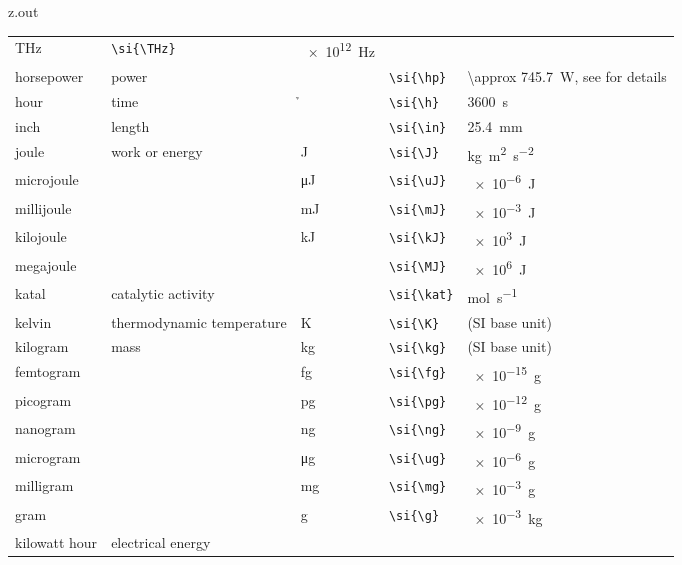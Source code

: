 \begin{VerbatimOut}{z.out}
{\begin{longtable}{@{}P{1.4in}P{1in}llP{1.8in}@{}}
      \si{\THz}&
      \verb+\si{\THz}+&
      \SI{e12}{\Hz}\\
    \vsp
    horsepower&
      power&
      \si{\hp}&
      \verb+\si{\hp}+&
      \SI{\approx 745.7}{\W},
        see \cite{wikipedia-horsepower} for details\\  %
    \vsp
    hour&
      time&
      \si{\h}&
      \verb+\si{\h}+&
      \SI{3600}{\s}\\
    \vsp
    inch&
      length&
      \si{\in}&
      \verb+\si{\in}+&
      \SI{25.4}{\mm}\\  %
    \vsp
    joule&
      work or energy&
      \si{\J}&
      \verb+\si{\J}+&
      \si{\kg\m\squared\per\s\squared}\\
    \quad microjoule&
      \ditto&
      \si{\uJ}&
      \verb+\si{\uJ}+&
      \SI{e-6}{\J}\\
    \quad millijoule&
      \ditto&
      \si{\mJ}&
      \verb+\si{\mJ}+&
      \SI{e-3}{\J}\\
    \quad kilojoule&
      \ditto&
      \si{\kJ}&
      \verb+\si{\kJ}+&
      \SI{e3}{\J}\\
    \quad megajoule&
      \ditto&
      \si{\MJ}&
      \verb+\si{\MJ}+&
      \SI{e6}{\J}\\
    \vsp
    katal&
      catalytic activity&
      \si{\kat}&
      \verb+\si{\kat}+&
      \si{\mol\per\s}\\
    \vsp
    kelvin&
      thermodynamic temperature&
      \si{\K}&
      \verb+\si{\K}+&
      (SI base unit)\\
    \vsp
    kilogram&
      mass&
      \si{\kg}&
      \verb+\si{\kg}+&
      (SI base unit)\\
    \quad femtogram&
      \ditto&
      \si{\fg}&
      \verb+\si{\fg}+&
      \SI{e-15}{\g}\\
    \quad picogram&
      \ditto&
      \si{\pg}&
      \verb+\si{\pg}+&
      \SI{e-12}{\g}\\
    \quad nanogram&
      \ditto&
      \si{\ng}&
      \verb+\si{\ng}+&
      \SI{e-9}{\g}\\
    \quad microgram&
      \ditto&
      \si{\ug}&
      \verb+\si{\ug}+&
      \SI{e-6}{\g}\\
    \quad milligram&
      \ditto&
      \si{\mg}&
      \verb+\si{\mg}+&
      \SI{e-3}{\g}\\
    \quad gram&
      \ditto&
      \si{\g}&
      \verb+\si{\g}+&
      \SI{e-3}{\kg}\\
    \vsp
    kilowatt hour&
      electrical energy&

\end{longtable}}
\end{VerbatimOut}
